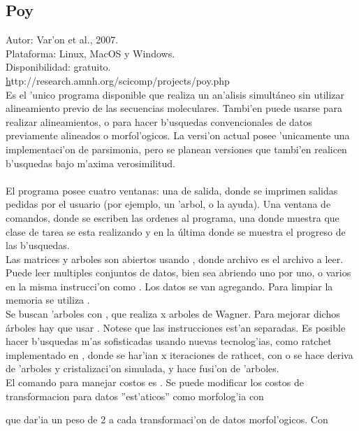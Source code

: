 \subsection{Poy}
\noindent
Autor: Var'on et al., 2007.\\
Plataforma: Linux, MacOS y Windows.\\
Disponibilidad: gratuito.\\
\href{}http://research.amnh.org/scicomp/projects/poy.php
\\
Es el 'unico programa disponible que realiza un an'alisis simult\'aneo sin utilizar alineamiento previo de las secuencias moleculares. Tambi'en puede usarse para realizar alineamientos, o para hacer b'usquedas convencionales de datos previamente alineados o morfol'ogicos. La versi'on actual posee 'unicamente una implementaci'on de parsimonia, pero se planean versiones que tambi'en realicen b'usquedas bajo m'axima verosimilitud.\\
\\
El programa posee cuatro ventanas: una de salida, donde se imprimen salidas pedidas por el usuario (por ejemplo, un 'arbol, o la ayuda). Una ventana de comandos, donde se escriben las ordenes al programa, una donde muestra que clase de tarea se esta realizando y en la \'ultima donde se muestra el progreso de las b'usquedas.\\
Las matrices y arboles son abiertos usando , donde archivo es el archivo a leer. Puede leer multiples conjuntos de datos, bien sea abriendo uno por uno, o varios en la misma instrucci'on como . Los datos se van agregando. Para limpiar la memoria se utiliza .\\
Se buscan 'arboles con , que realiza x arboles de Wagner. Para mejorar dichos \'arboles hay que usar . Notese que las instrucciones est'an separadas. Es posible hacer b'usquedas m'as sofisticadas usando nuevas tecnolog'ias, como ratchet implementado en , donde se har'ian x iteraciones de rathcet, con  o  se hace deriva de 'arboles y cristalizaci'on simulada, y  hace fusi'on de 'arboles.\\
El comando para manejar costos es . Se puede modificar los costos de transformacion para datos ''est'aticos'' como morfolog'ia con 


que dar'ia un peso de 2 a cada transformaci'on de datos morfol'ogicos. Con 

